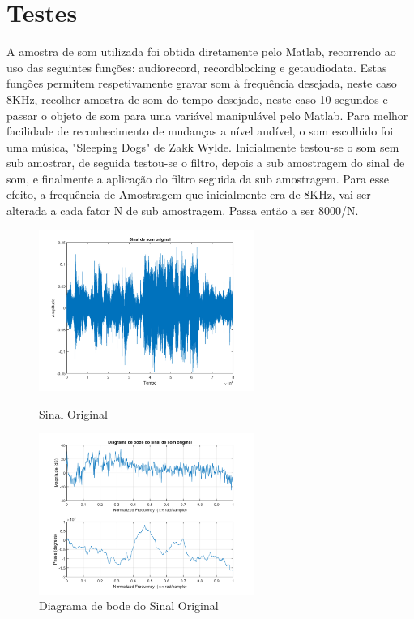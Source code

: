 \documentclass[11pt]{article}
\begin{document}
\section{Testes}
A amostra de som utilizada foi obtida diretamente pelo Matlab, recorrendo ao uso das seguintes funções: audiorecord, recordblocking e getaudiodata. Estas funções permitem respetivamente gravar som à frequência desejada, neste caso 8KHz, recolher amostra de som do tempo desejado, neste caso 10 segundos e passar o objeto de som para  uma variável manipulável pelo Matlab. Para melhor facilidade de reconhecimento de mudanças a nível audível, o som escolhido foi uma música, "Sleeping Dogs" de Zakk Wylde.
Inicialmente testou-se o som sem sub amostrar, de seguida testou-se o filtro, depois a sub amostragem do sinal de som, e finalmente a aplicação do filtro seguida da sub amostragem.
Para esse efeito, a frequência de Amostragem que inicialmente era de 8KHz, vai ser alterada a cada fator N de sub amostragem. Passa então a ser 8000/N.
\begin{figure}[h]
\begin{center}
\begin{minipage}[b]{0.45\linewidth}
\includegraphics[width=7cm]{origis.png}
\caption{Sinal Original}
\label{figura6}
\end{minipage}
\begin{minipage}[b]{0.45\linewidth}
\includegraphics[width=7cm]{origib.png}
\caption{Diagrama de bode do Sinal Original}
\label{figura7}
\end{minipage}
\end{center}
\end{figure}
\newpage
\end{document}
